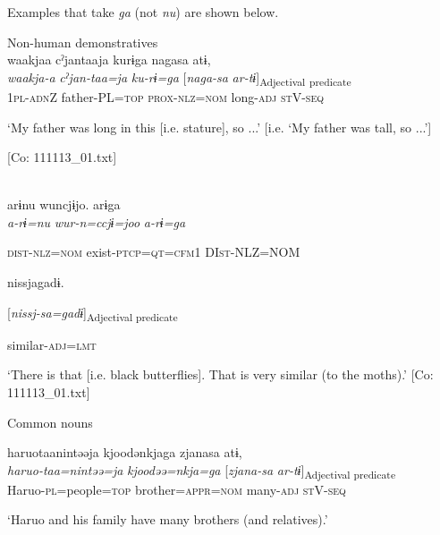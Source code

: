 Examples that take \textit{ga} (not \textit{nu}) are shown below.

\ea\label{ex:6-127}
 Non-human demonstratives\\

 \ea {\TM}  waakjaa  cˀjantaaja  kurɨga  nagasa  atɨ,\\
\gll \textit{waakja-a}  \textit{cˀjan-taa=ja}  \textit{ku-rɨ=ga}  [\textit{naga-sa}  \textit{ar-tɨ}]\textsubscript{Adjectival} \textsubscript{predicate}\\

      1\textsc{pl}-\textsc{adn}Z  father{}-PL=\textsc{top}  \textsc{prox}-\textsc{nlz}=\textsc{nom}  long{}-\textsc{adj}  \textsc{st}V-\textsc{seq}

\glt ‘My father was long in this [i.e. stature], so ...’ [i.e. ‘My father was tall, so ...’]

      [Co: 111113\_01.txt]
\z

 \ex{}\\
{\TM}
\gll  arɨnu  wuncjɨjo.  arɨga\\

      \textit{a-rɨ=nu}  \textit{wur-n=ccjɨ=joo}  \textit{a-rɨ=ga}

      \textsc{dist}-\textsc{nlz}=\textsc{nom}  exist-\textsc{ptcp}=\textsc{qt}=\textsc{cfm}1  DI\textsc{st}-NLZ=NOM

      nissjagadɨ.

      [\textit{nissj-sa=gadɨ}]\textsubscript{Adjectival predicate}

      similar-\textsc{adj}=\textsc{lmt}

\glt ‘There is that [i.e. black butterflies]. That is very similar (to the moths).’ [Co: 111113\_01.txt]
\z

  Common nouns

 \ex {\TM}  haruotaanintəəja  kjoodənkjaga  zjanasa  atɨ,\\
\gll \textit{haruo-taa=nintəə=ja}  \textit{kjoodəə=nkja=ga}  [\textit{zjana-sa}  \textit{ar-tɨ}]\textsubscript{Adjectival predicate}\\

      Haruo-\textsc{pl}=people=\textsc{top}  brother=\textsc{appr}=\textsc{nom}  many-\textsc{adj}  \textsc{st}V-\textsc{seq}

\glt ‘Haruo and his family have many brothers (and relatives).’

